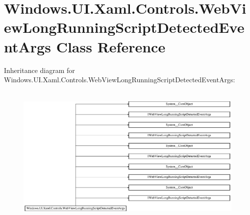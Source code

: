 \hypertarget{class_windows_1_1_u_i_1_1_xaml_1_1_controls_1_1_web_view_long_running_script_detected_event_args}{}\section{Windows.\+U\+I.\+Xaml.\+Controls.\+Web\+View\+Long\+Running\+Script\+Detected\+Event\+Args Class Reference}
\label{class_windows_1_1_u_i_1_1_xaml_1_1_controls_1_1_web_view_long_running_script_detected_event_args}
Inheritance diagram for Windows.\+U\+I.\+Xaml.\+Controls.\+Web\+View\+Long\+Running\+Script\+Detected\+Event\+Args\+:\begin{figure}[H]
\begin{center}
\leavevmode
\includegraphics[height=6.984127cm]{class_windows_1_1_u_i_1_1_xaml_1_1_controls_1_1_web_view_long_running_script_detected_event_args}
\end{center}
\end{figure}

